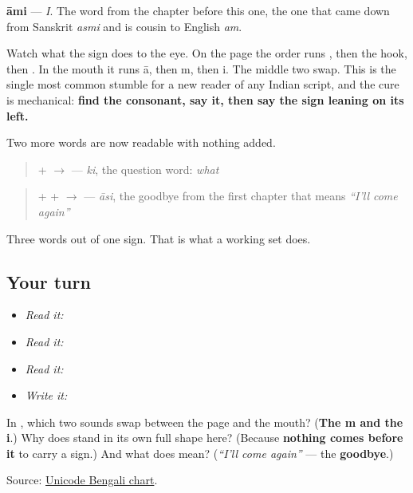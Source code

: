 \textbf{āmi} — \emph{I}. The word from the chapter before this one, the one that came down from Sanskrit \emph{asmi} and is cousin to English \emph{am}.

Watch what the sign does to the eye. On the page the order runs , then the hook, then . In the mouth it runs ā, then m, then i. The middle two swap. This is the single most common stumble for a new reader of any Indian script, and the cure is mechanical: \textbf{find the consonant, say it, then say the sign leaning on its left.}

Two more words are now readable with nothing added.

\begin{quote}
\textbf{} + \textbf{} $\to$ \textbf{} — \emph{ki}, the question word: \emph{what}
\end{quote}

\begin{quote}
\textbf{} + \textbf{} + \textbf{} $\to$ \textbf{} — \emph{āsi}, the goodbye from the first chapter that means \emph{\textquotedblleft{}I'll come again\textquotedblright{}}
\end{quote}

Three words out of one sign. That is what a working set does.

\subsection*{Your turn}
\begin{itemize}
\raggedright
  \item \emph{Read it:} 
  \item \emph{Read it:} 
  \item \emph{Read it:} 
  \item \emph{Write it:} 
\end{itemize}

\begin{tcolorbox}[breakable,colback=teal!4,colframe=teal!35!black,title={Before you move on}]
In \textbf{}, which two sounds swap between the page and the mouth? (\textbf{The m and the i}.) Why does \textbf{} stand in its own full shape here? (Because \textbf{nothing comes before it} to carry a sign.) And what does \textbf{} mean? (\emph{\textquotedblleft{}I'll come again\textquotedblright{}} — the \textbf{goodbye}.)

Source: \href{https://www.unicode.org/charts/PDF/U0980.pdf}{Unicode Bengali chart}.
\end{tcolorbox}
